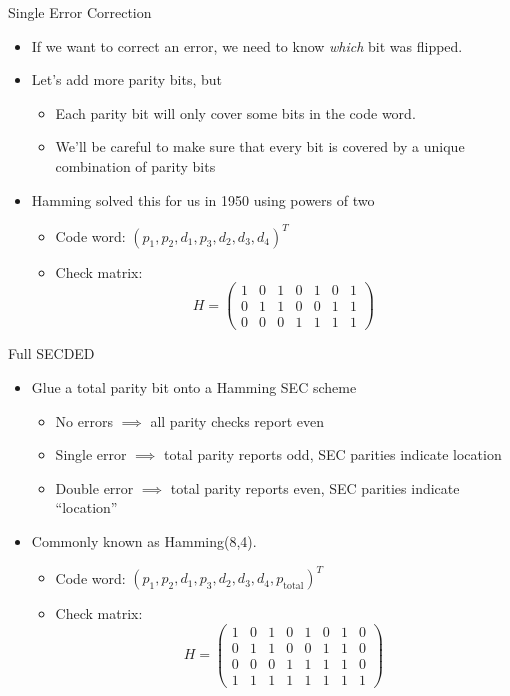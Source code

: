 \documentclass[pdf]{beamer}
\begin{document}
\begin{frame}{Single Error Correction}
  \begin{itemize}
    \item If we want to correct an error, we need to know \emph{which} bit was
      flipped.
    \pause\item Let's add more parity bits, but
      \begin{itemize}
      \item Each parity bit will only cover some bits in the code word.
      \item We'll be careful to make sure that every bit is covered by a unique
        combination of parity bits
      \end{itemize}
    \pause\item Hamming solved this for us in 1950 using powers of two
      \begin{itemize}
      \item Code word: $(p_1,p_2,d_1,p_3,d_2,d_3,d_4)^T$
      \item Check matrix: \[ H = \begin{pmatrix}
            1 & 0 & 1 & 0 & 1 & 0 & 1 \\
            0 & 1 & 1 & 0 & 0 & 1 & 1 \\
            0 & 0 & 0 & 1 & 1 & 1 & 1
          \end{pmatrix} \]
      \end{itemize}
  \end{itemize}
\end{frame}
\begin{frame}{Full SECDED}
  \begin{itemize}
  \item Glue a total parity bit onto a Hamming SEC scheme
    \begin{itemize}
    \item No errors $\implies$ all parity checks report even
    \item Single error $\implies$ total parity reports odd, SEC parities indicate location
    \item Double error $\implies$ total parity reports even, SEC parities indicate ``location''
    \end{itemize}
  \pause\item Commonly known as Hamming(8,4).
    \begin{itemize}
      \item Code word: $(p_1,p_2,d_1,p_3,d_2,d_3,d_4,p_\text{total})^T$
      \item Check matrix: \[ H = \begin{pmatrix}
            1 & 0 & 1 & 0 & 1 & 0 & 1 & 0 \\
            0 & 1 & 1 & 0 & 0 & 1 & 1 & 0 \\
            0 & 0 & 0 & 1 & 1 & 1 & 1 & 0 \\
            1 & 1 & 1 & 1 & 1 & 1 & 1 & 1
          \end{pmatrix} \]
      \end{itemize}
  \end{itemize}
\end{frame}
\end{document}
